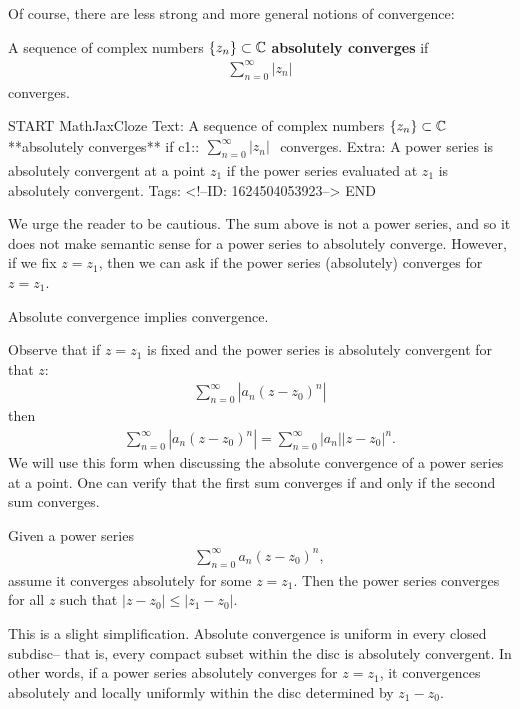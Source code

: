 \documentclass{memoir}
\begin{document}
Of course, there are less strong and more general notions of convergence:

\begin{defn}
	A sequence of complex numbers \(\left\{ z_n \right\}\subset \mathbb{C} \) \textbf{absolutely converges} if
	\begin{align*}
	\sum_{n=0}^{\infty} \left| z_n \right| 
	\end{align*}
	converges.
\end{defn}

\begin{anki}
START
MathJaxCloze
Text: A sequence of complex numbers \(\left\{ z_n \right\} \subset \mathbb{C} \) **absolutely converges** if
 {{c1::\(\begin{align*}
        \sum_{n=0}^{\infty} \left| z_n \right| 
        \end{align*}\)}} 
	converges.
Extra: A power series is absolutely convergent at a point \(z_1\) if the power series evaluated at \(z_1\) is absolutely convergent.
Tags: 
<!--ID: 1624504053923-->
END
\end{anki}

We urge the reader to be cautious. The sum above is not a power series, and so it does not make semantic sense for a power series to absolutely converge. However, if we fix \(z = z_1\), then we can ask if the power series (absolutely) converges for \(z = z_1\).\\

\begin{prop}
	Absolute convergence implies convergence.
\end{prop}

Observe that if \(z = z_1\) is fixed and the power series is absolutely convergent for that \(z\):
\begin{align*}
	\sum_{n=0}^{\infty} \left| a_n (z-z_0)^{n} \right| 
\end{align*}
then
\begin{align*}
	\sum_{n=0}^{\infty} \left| a_n (z-z_0)^{n} \right| = \sum_{n=0}^{\infty} \left| a_n \right| \left| z-z_0 \right|^{n}.
\end{align*}
We will use this form when discussing the absolute convergence of a power series at a point. One can verify that the first sum converges if and only if the second sum converges.

\begin{prop}
	Given a power series
	\begin{align*}
	\sum_{n=0}^{\infty} a_n (z-z_0)^{n},
	\end{align*}
	assume it converges absolutely for some \(z=z_1\). Then the power series converges for all \(z\) such that \(\left| z-z_0 \right| \leq \left| z_1-z_0 \right| \).
\end{prop}
This is a slight simplification. Absolute convergence is uniform in every closed subdisc-- that is, every compact subset within the disc is absolutely convergent. In other words, if a power series absolutely converges for \(z = z_1\), it convergences absolutely and locally uniformly within the disc determined by \(z_1-z_0 \).
\end{document}
